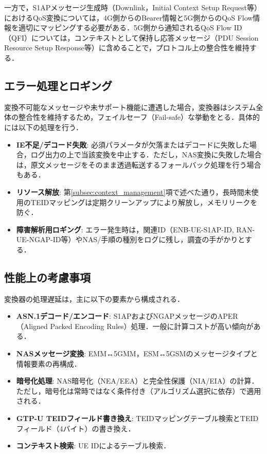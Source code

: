 一方で，S1APメッセージ生成時（Downlink，Initial Context Setup Request等）におけるQoS変換については，4G側からのBearer情報と5G側からのQoS Flow情報を適切にマッピングする必要がある．5G側から通知されるQoS Flow ID（QFI）については，コンテキストとして保持し応答メッセージ（PDU Session Resource Setup Response等）に含めることで，プロトコル上の整合性を維持する．

\subsection{エラー処理とロギング}
変換不可能なメッセージや未サポート機能に遭遇した場合，変換器はシステム全体の整合性を維持するため，フェイルセーフ（Fail-safe）な挙動をとる．具体的には以下の処理を行う．

\begin{itemize}
\item \textbf{IE不足/デコード失敗}: 必須パラメータが欠落またはデコードに失敗した場合，ログ出力の上で当該変換を中止する．ただし，NAS変換に失敗した場合は，原文メッセージをそのまま透過転送するフォールバック処理を行う場合もある．
\item \textbf{リソース解放}: 第\ref{subsec:context_management}項で述べた通り，長時間未使用のTEIDマッピングは定期クリーンアップにより解放し，メモリリークを防ぐ．
\item \textbf{障害解析用ロギング}: エラー発生時は，関連ID（ENB-UE-S1AP-ID, RAN-UE-NGAP-ID等）やNAS/手順の種別をログに残し，調査の手がかりとする．
\end{itemize}

\subsection{性能上の考慮事項}
変換器の処理遅延は，主に以下の要素から構成される．
\begin{itemize}
\item \textbf{ASN.1デコード/エンコード}: S1APおよびNGAPメッセージのAPER（Aligned Packed Encoding Rules）処理．一般に計算コストが高い傾向がある．
\item \textbf{NASメッセージ変換}: EMM↔5GMM，ESM↔5GSMのメッセージタイプと情報要素の再構成．
\item \textbf{暗号化処理}: NAS暗号化（NEA/EEA）と完全性保護（NIA/EIA）の計算．ただし，暗号化は常時ではなく条件付き（アルゴリズム選択に依存）で適用される．
\item \textbf{GTP-U TEIDフィールド書き換え}: TEIDマッピングテーブル検索とTEIDフィールド（4バイト）の書き換え．
\item \textbf{コンテキスト検索}: UE IDによるテーブル検索．
\end{itemize}

